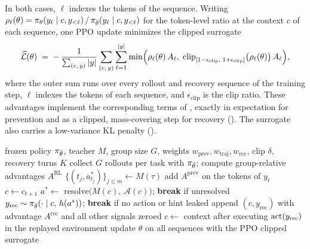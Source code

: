 In both cases, $\ell$ indexes the tokens of the sequence. Writing $\rho_\ell(\theta) = \pi_\theta(y_\ell \mid c, y_{<\ell}) \,/\, \pi_{\bar\theta}(y_\ell \mid c, y_{<\ell})$ for the token-level ratio at the context $c$ of each sequence, one PPO update minimizes the clipped surrogate
\begin{equation}
\widehat{\mathcal{L}}(\theta) \;=\; -\, \frac{1}{\sum_{(c,\, y)} |y|} \sum_{(c,\, y)} \sum_{\ell=1}^{|y|} \min\Bigl( \rho_\ell(\theta)\, A_{\ell},\; \operatorname{clip}_{[1-\epsilon_\text{clip},\; 1+\epsilon_\text{clip}]}\bigl(\rho_\ell(\theta)\bigr)\, A_{\ell} \Bigr),
\label{eq:loss}
\end{equation}
where the outer sum runs over every rollout and recovery sequence of the training step, $\ell$ indexes the tokens of each sequence, and $\epsilon_\text{clip}$ is the clip ratio. These advantages implement the corresponding terms of , exactly in expectation for prevention and as a clipped, mass-covering step for recovery (). The surrogate also carries a low-variance KL penalty ().

\begin{algorithm}[h]
\caption{One training step of \method{}}
\label{alg:method}
\begin{algorithmic}[1]
\Require frozen policy $\pi_{\bar\theta}$, teacher $M$, group size $G$, weights $w_\text{prev}, w_\text{traj}, w_\text{rec}$, clip $\delta$, recovery turns $K$
\State collect $G$ rollouts per task with $\pi_{\bar\theta}$; compute group-relative advantages $A^{\mathrm{RL}}$
    \State $\{(t_j, a^{*}_{t_j})\}_{j \le m} \gets M(\tau)$ 
         
            \State add $A^{\mathrm{prev}}$ on the tokens of $y_t$ 
            \State $c \gets c_{t+1}$
                \State $a^{*} \gets$ resolve$\big(M(c),\, \mathcal{A}(c)\big)$; \textbf{break} if unresolved
                \State $y_\text{rec} \sim \pi_{\bar\theta}\!\left(\cdot \mid c,\, h(a^{*})\right)$; \textbf{break} if no action or hint leaked
                \State append $(c, y_\text{rec})$ with advantage $A^{\mathrm{rec}}$ and all other signals zeroed 
                 \State $c \gets$ context after executing $\operatorname{act}(y_\text{rec})$ in the replayed environment \EndIf
            \EndFor
        \EndIf
    \EndFor
\EndFor
\State update $\theta$ on all sequences with the PPO clipped surrogate 
\end{algorithmic}
\end{algorithm}

